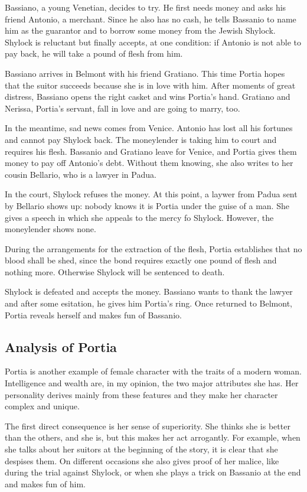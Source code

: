 \documentclass[]{article}
\begin{document}
Bassiano, a young Venetian, decides to try. He first needs money and asks his friend Antonio, a merchant. Since he also has no cash, he tells Bassanio to name him as the guarantor and to borrow some money from the Jewish Shylock. Shylock is reluctant but finally accepts, at one condition: if Antonio is not able to pay back, he will take a pound of flesh from him.

Bassiano arrives in Belmont with his friend Gratiano. This time Portia hopes that the suitor succeeds because she is in love with him. After moments of great distress, Bassiano opens the right casket and wins Portia's hand. Gratiano and Nerissa, Portia's servant, fall in love and are going to marry, too.

In the meantime, sad news comes from Venice. Antonio has lost all his fortunes and cannot pay Shylock back. The moneylender is taking him to court and requires his flesh. Bassanio and Gratiano leave for Venice, and Portia gives them money to pay off Antonio's debt. Without them knowing, she also writes to her cousin Bellario, who is a lawyer in Padua.

In the court, Shylock refuses the money. At this point, a laywer from Padua sent by Bellario shows up: nobody knows it is Portia under the guise of a man. She gives a speech in which she appeals to the mercy fo Shylock. However, the moneylender shows none.

During the arrangements for the extraction of the flesh, Portia establishes that no blood shall be shed, since the bond requires exactly one pound of flesh and nothing more. Otherwise Shylock will be sentenced to death.

Shylock is defeated and accepts the money. Bassiano wants to thank the lawyer and after some esitation, he gives him Portia's ring. Once returned to Belmont, Portia reveals herself and makes fun of Bassanio.

\subsection*{Analysis of Portia}
\hspace{1em}
Portia is another example of female character with the traits of a modern woman. Intelligence and wealth are, in my opinion, the two major attributes she has. Her personality derives mainly from these features and they make her character complex and unique.

The first direct consequence is her sense of superiority. She thinks she is better than the others, and she is, but this makes her act arrogantly. For example, when she talks about her suitors at the beginning of the story, it is clear that she despises them. On different occasions she also gives proof of her malice, like during the trial against Shylock, or when she plays a trick on Bassanio at the end and makes fun of him.
\end{document}
